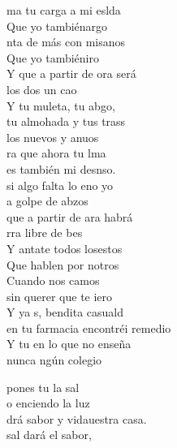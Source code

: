 \begin{cancion}%
	ma tu carga a mi eslda\\
	Que yo tambiénargo\\
	nta de más con misanos\\
	Que yo tambiéniro\\
	Y  que a partir de ora será\\
	 los dos un cao\\
	Y tu muleta, tu abgo,\\
	tu almohada y tus trass\\
	los nuevos y anuos\\
	\jump
	ra que ahora tu lma\\
	es también mi desnso.\\
	 si algo falta lo eno yo\\
	a golpe de abzos\\
	que a partir de ara habrá\\
	rra libre de bes\\
	Y antate todos losestos\\
	Que hablen por notros\\
	Cuando nos camos\\
	\jump
	 sin querer que te iero\\
	Y ya s, bendita casuald\\
	 en tu farmacia encontréi remedio\\
	Y tu en  lo que no enseña  \\
	nunca ngún colegio\jump\\
	\begin{chorus}%
		 pones tu la sal \\
		o enciendo la luz\\
		drá sabor y vidauestra casa.\\
		 sal dará el sabor, \\

\end{chorus}
\end{cancion}
